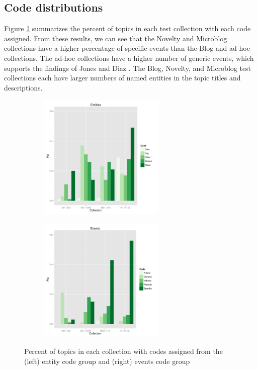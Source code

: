 \documentclass[runningheads,a4paper]{llncs}
\begin{document}
\subsection{Code distributions}

Figure \ref{fig.codedist} summarizes the percent of topics in each test collection with each code assigned. From these results, we can see that the Novelty and Microblog  collections have a higher percentage of specific events than the Blog and ad-hoc collections. The ad-hoc collections have a higher number of generic events, which supports the findings of Jones and Diaz \cite{Jones2007}. The Blog, Novelty, and Microblog test collections each have larger numbers of named entities in the topic titles and descriptions.

\begin{figure}
\centering
\begin{subfigure}{.5\textwidth}
  \centering
\includegraphics[width=6cm]{plots/topic-groups-ent.pdf}
\end{subfigure}%
\begin{subfigure}{.5\textwidth}
  \centering
\includegraphics[width=6cm]{plots/topic-groups-evt.pdf}
\end{subfigure}
\caption{Percent of topics in each collection with codes assigned from the (left) entity code group and (right) events code group}
\label{fig.codedist}
\end{figure}
\end{document}
